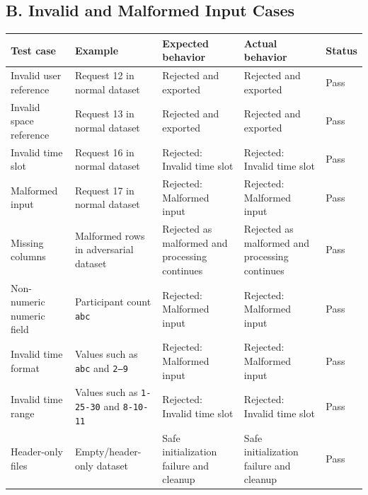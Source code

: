 \documentclass[12pt,a4paper]{article}
\begin{document}
\subsection*{B. Invalid and Malformed Input Cases}
\begin{center}
\footnotesize
\begin{tabularx}{\textwidth}{@{} p{3.2cm} p{3.0cm} X X p{1.1cm} @{}}
\toprule
\textbf{Test case} & \textbf{Example} & \textbf{Expected behavior} & \textbf{Actual behavior} & \textbf{Status} \\
\midrule
Invalid user reference & Request 12 in normal dataset & Rejected and exported & Rejected and exported & Pass \\
Invalid space reference & Request 13 in normal dataset & Rejected and exported & Rejected and exported & Pass \\
Invalid time slot & Request 16 in normal dataset & Rejected: Invalid time slot & Rejected: Invalid time slot & Pass \\
Malformed input & Request 17 in normal dataset & Rejected: Malformed input & Rejected: Malformed input & Pass \\
Missing columns & Malformed rows in adversarial dataset & Rejected as malformed and processing continues & Rejected as malformed and processing continues & Pass \\
Non-numeric numeric field & Participant count \texttt{abc} & Rejected: Malformed input & Rejected: Malformed input & Pass \\
Invalid time format & Values such as \texttt{abc} and \texttt{2--9} & Rejected: Malformed input & Rejected: Malformed input & Pass \\
Invalid time range & Values such as \texttt{1-25-30} and \texttt{8-10-11} & Rejected: Invalid time slot & Rejected: Invalid time slot & Pass \\
Header-only files & Empty/header-only dataset & Safe initialization failure and cleanup & Safe initialization failure and cleanup & Pass \\
\bottomrule
\end{tabularx}
\end{center}
\normalsize

\end{document}
